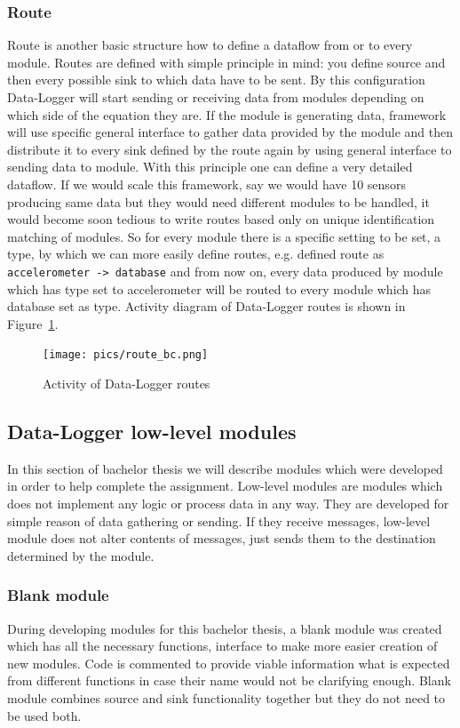 \subsubsection{Route} %
\label{ssub:route}
Route is another basic structure how to define a dataflow from or to every module. Routes are defined with simple principle in mind: you define source and then every possible sink to which data have to be sent. By this configuration Data-Logger will start sending or receiving data from modules depending on which side of the equation they are. If the module is generating data, framework will use specific general interface to gather data provided by the module and then distribute it to every sink defined by the route again by using general interface to sending data to module. With this principle one can define a very detailed dataflow. If we would scale this framework, say we would have 10 sensors producing same data but they would need different modules to be handled, it would become soon tedious to write routes based only on unique identification matching of modules. So for every module there is a specific setting to be set, a type, by which we can more easily define routes, e.g. defined route as \verb|accelerometer -> database| and from now on, every data produced by module which has type set to accelerometer will be routed to every module which has database set as type. Activity diagram of Data-Logger routes is shown in Figure~\ref{fig:act}. 
\begin{figure}[H]
\begin{center}
\captionsetup{font=small}
\texttt{[image: pics/route\_bc.png]}
\caption{Activity of Data-Logger routes}
\label{fig:act}
\end{center}
\end{figure}
\label{sub:data_logger_framework}
\subsection{Data-Logger low-level modules}

In this section of bachelor thesis we will describe modules which were developed in order to help complete the assignment. Low-level modules are modules which does not implement any logic or process data in any way. They are developed for simple reason of data gathering or sending. If they receive messages, low-level module does not alter contents of messages, just sends them to the destination determined by the module.
\subsubsection{Blank module} %
\label{ssub:blank_module}
During developing modules for this bachelor thesis, a blank module was created which has all the necessary functions, interface to make more easier creation of new modules. Code is commented to provide viable information what is expected from different functions in case their name would not be clarifying enough. Blank module combines source and sink functionality together but they do not need to be used both.
